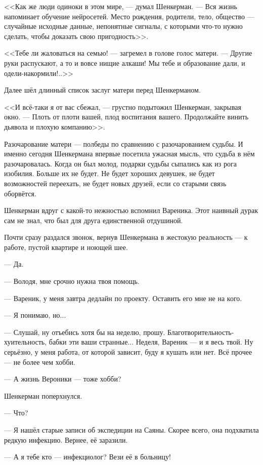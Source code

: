 <<Как же люди одиноки в этом мире, --- думал Шенкерман.
--- Вся жизнь напоминает обучение нейросетей.
Место рождения, родители, тело, общество --- случайные исходные данные, непонятные сигналы, с которыми что-то нужно сделать, чтобы доказать свою пригодность>>.

<<Тебе ли жаловаться на семью! --- загремел в голове голос матери.
--- Другие руки распускают, а то и вовсе нищие алкаши!
Мы тебе и образование дали, и одели-накормили!..>>

Далее шёл длинный список заслуг матери перед Шенкерманом.

<<И всё-таки я от вас сбежал, --- грустно подытожил Шенкерман, закрывая окно.
--- Плоть от плоти вашей, плод воспитания вашего.
Продолжайте винить дьявола и плохую компанию>>.

Разочарование матери --- полбеды по сравнению с разочарованием судьбы.
И именно сегодня Шенкермана впервые посетила ужасная мысль, что судьба в нём разочаровалась.
Когда он был молод, подарки судьбы сыпались как из рога изобилия.
Больше их не будет.
Не будет хороших девушек, не будет возможностей переехать, не будет новых друзей, если со старыми связь оборвётся.

Шенкерман вдруг с какой-то нежностью вспомнил Вареника.
Этот наивный дурак сам не знал, что был для друга единственной отдушиной.

Почти сразу раздался звонок, вернув Шенкермана в жестокую реальность --- к работе, пустой квартире и ноющей шее.

--- Да.

--- Володя, мне срочно нужна твоя помощь.

--- Вареник, у меня завтра дедлайн по проекту.
Оставить его мне не на кого.

--- Я понимаю, но...

--- Слушай, ну отъебись хотя бы на неделю, прошу.
Благотворительность-хуительность, бабки эти ваши странные...
Неделя, Вареник --- и я весь твой.
Ну серьёзно, у меня работа, от которой зависит, буду я кушать или нет.
Всё прочее --- не более чем хобби.

--- А жизнь Вероники --- тоже хобби?

Шенкерман поперхнулся.

--- Что?

--- Я нашёл старые записи об экспедиции на Саяны.
Скорее всего, она подхватила редкую инфекцию.
Вернее, её заразили.

--- А я тебе кто --- инфекциолог?
Вези её в больницу!

